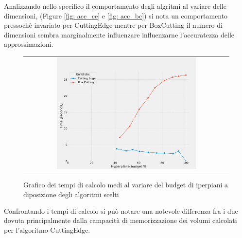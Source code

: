 Analizzando nello specifico il comportamento degli algritmi al variare delle dimensioni,
(Figure \ref*{fig: acc_ce} e \ref*{fig: acc_bc}) si nota un comportamento pressochè 
invariato per CuttingEdge mentre per BoxCutting il numero di dimensioni 
sembra marginalmente influenzare influenzarne l'accuratezza delle approssimazioni.

\begin{figure}[H]
    \centering
    \begin{tabular}{c}
        \includegraphics[width=0.7\textwidth]{media/report_ndim/ndim_time.pdf} \\
    \end{tabular}
    \caption{Grafico dei tempi di calcolo medi al variare del budget di iperpiani 
    a diposizione degli algoritmi scelti}
\end{figure}

Confrontando i tempi di calcolo si può notare una notevole differenza fra i due dovuta
principalmente dalla campacità di memorizzazione dei volumi calcolati per l'algoritmo 
CuttingEdge.


